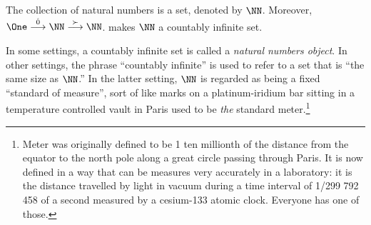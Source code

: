 \begin{axiom}
	The collection of natural numbers is a set, denoted by $\NN$. Moreover, $\One\stackrel{\hat{0}}{\longrightarrow}\NN\stackrel{\succ}{\longrightarrow}\NN$.
makes $\NN$ a countably infinite set.
\end{axiom}

In some settings, a countably infinite set is called a \emph{natural numbers object}. In other settings, the phrase ``countably infinite'' is used to refer to a set that is ``the same size as $\NN$.'' In the latter setting, $\NN$ is regarded as being a fixed ``standard of measure'', sort of like marks on a platinum-iridium bar sitting in a temperature controlled vault in Paris used to be \emph{the} standard meter.\footnote{Meter was originally defined to be 1 ten millionth of the distance from the equator to the north pole along a great circle passing through Paris. It is now defined in a way that can be measures very accurately in a laboratory: it is the distance travelled by light in vacuum during a time interval of 1/299 792 458 of a second measured by a cesium-133 atomic clock. Everyone has one of those.}
